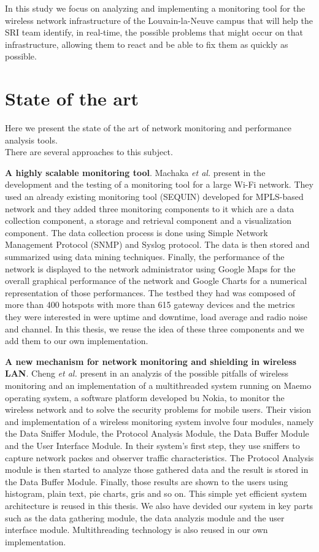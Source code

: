 In this study we focus on analyzing and implementing a monitoring tool for the wireless network infrastructure of the Louvain-la-Neuve campus that will help the SRI team identify, in real-time, the possible problems that might occur on that infrastructure, allowing them to react and be able to fix them as quickly as possible.


\section{State of the art}
Here we present the state of the art of network monitoring and performance analysis tools.\\
There are several approaches to this subject.

\textbf{A highly scalable monitoring tool}. Machaka \textit{et al.} present in \cite{article1} the development and the testing of a monitoring tool for a large Wi-Fi network. They used an already existing monitoring tool (SEQUIN) developed for MPLS-based network and they added three monitoring components to it which are a data collection component, a storage and retrieval component and a visualization component. The data collection process is done using Simple Network Management Protocol (SNMP) and Syslog protocol. The data is then stored and summarized using data mining techniques. Finally, the performance of the network is displayed to the network administrator using Google Maps for the overall graphical performance of the network and Google Charts for a numerical representation of those performances. The testbed they had was composed of more than 400 hotspots with more than 615 gateway devices and the metrics they were interested in were uptime and downtime, load average and radio noise and channel. In this thesis, we reuse the idea of these three components and we add them to our own implementation.

\textbf{A new mechanism for network monitoring and shielding in wireless LAN}. Cheng \textit{et al.} present in \cite{article2} an analyzis of the possible pitfalls of wireless monitoring and an implementation of a multithreaded system running on Maemo operating system, a software platform developed bu Nokia, to monitor the wireless network and to solve the security problems for mobile users. Their vision and implementation of a wireless monitoring system involve four modules, namely the Data Sniffer Module, the Protocol Analysis Module, the Data Buffer Module and the User Interface Module. In their system's first step, they use sniffers to capture network packes and observer traffic characteristics. The Protocol Analysis module is then started to analyze those gathered data and the result is stored in the Data Buffer Module. Finally, those results are shown to the users using histogram, plain text, pie charts, gris and so on. This simple yet efficient system architecture is reused in this thesis. We also have devided our system in key parts such as the data gathering module, the data analyzis module and the user interface module. Multithreading technology is also reused in our own implementation.

